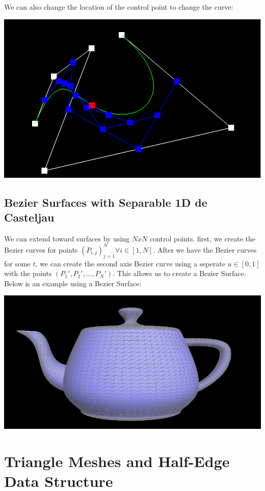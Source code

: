 \documentclass{article}
\begin{document}
We can also change the location of the control point to change the curve:
\begin{center}
    \includegraphics[]{Part 1/changed.png}
\end{center}
\subsection{Bezier Surfaces with Separable 1D de Casteljau}
We can extend toward surfaces by using $N x N$ control points. first, we create the Bezier curves for points $(P_{i, j})_{j = 1}^N\forall i \in [1, N]$. After we have the Bezier curves for some $t$, we can create the second axis Bezier curve using a seperate $u \in [0, 1]$ with the points $(P_1', P_2',...,P_N')$. This allows us to create a Bezier Surface. Below is an example using a Bezier Surface:
\begin{center}
    \includegraphics[scale = 0.5]{Part 2/teapot.png}
\end{center}
\section{Triangle Meshes and Half-Edge Data Structure}
\end{document}
